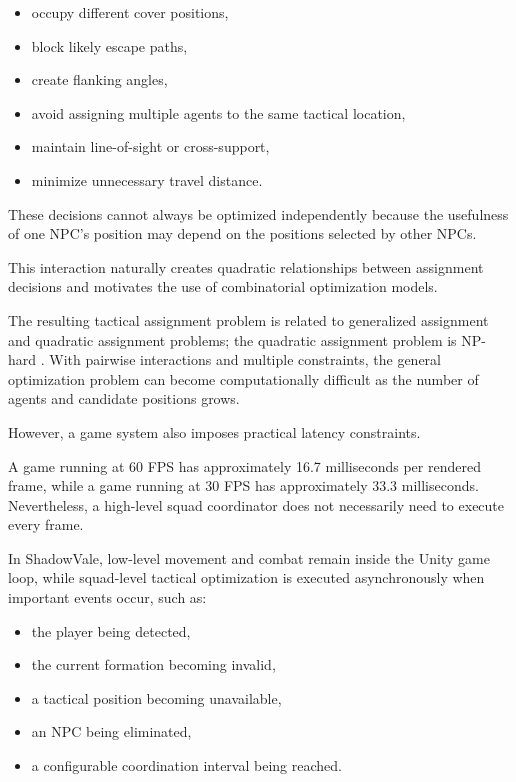 \documentclass[12pt, a4paper]{article}
\begin{document}
\begin{itemize}
\item occupy different cover positions,
\item block likely escape paths,
\item create flanking angles,
\item avoid assigning multiple agents to the same tactical location,
\item maintain line-of-sight or cross-support,
\item minimize unnecessary travel distance.
\end{itemize}

These decisions cannot always be optimized independently because the usefulness of one NPC's position may depend on the positions selected by other NPCs.

This interaction naturally creates quadratic relationships between assignment decisions and motivates the use of combinatorial optimization models.

The resulting tactical assignment problem is related to generalized assignment and quadratic assignment problems; the quadratic assignment problem is NP-hard \cite{Sahni1976}. With pairwise interactions and multiple constraints, the general optimization problem can become computationally difficult as the number of agents and candidate positions grows.

However, a game system also imposes practical latency constraints.

A game running at 60 FPS has approximately 16.7 milliseconds per rendered frame, while a game running at 30 FPS has approximately 33.3 milliseconds. Nevertheless, a high-level squad coordinator does not necessarily need to execute every frame.

In ShadowVale, low-level movement and combat remain inside the Unity game loop, while squad-level tactical optimization is executed asynchronously when important events occur, such as:

\begin{itemize}
\item the player being detected,
\item the current formation becoming invalid,
\item a tactical position becoming unavailable,
\item an NPC being eliminated,
\item a configurable coordination interval being reached.
\end{itemize}
\end{document}

